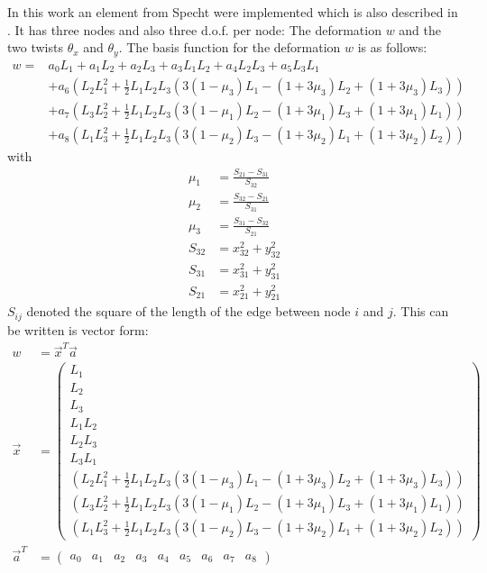   In this work an element from Specht \cite{specht1988modified} were implemented which is also described in \cite{steinke2005finite}. It has three nodes and also three d.o.f. per node: The deformation $w$ and the two twists $\theta_x$ and $\theta_y$. The basis function for the deformation $w$ is as follows:
  \begin{align}
  w = &a_0 L_1 + a_1 L_2 + a_2 L_3 + a_3 L_1L_2 + a_4 L_2L_3 + a_5 L_3L_1 \nonumber\\
    & + a_6\left(L_2L_1^2 + \frac{1}{2}L_1L_2L_3 \left(3(1-\mu_3)L_1 - (1+3\mu_3)L_2 + (1+3\mu_3)L_3\right)\right) \nonumber\\
    & + a_7\left(L_3L_2^2 + \frac{1}{2}L_1L_2L_3 \left(3(1-\mu_1)L_2 - (1+3\mu_1)L_3 + (1+3\mu_1)L_1\right)\right) \nonumber\\
    & + a_8\left(L_1L_3^2 + \frac{1}{2}L_1L_2L_3 \left(3(1-\mu_2)L_3 - (1+3\mu_2)L_1 + (1+3\mu_2)L_2\right)\right)
  \end{align}
  with
  \begin{align}
  \mu_1 &= \frac{S_{21} - S_{31}}{S_{32}} \nonumber\\
  \mu_2 &= \frac{S_{32} - S_{21}}{S_{31}} \nonumber\\
  \mu_3 &= \frac{S_{31} - S_{32}}{S_{21}} \\
  S_{32} &= x_{32}^2 + y_{32}^2 \nonumber\\
  S_{31} &= x_{31}^2 + y_{31}^2 \nonumber\\
  S_{21} &= x_{21}^2 + y_{21}^2
  \end{align}
  $S_{ij}$ denoted the square of the length of the edge between node $i$ and $j$.
  This can be written is vector form:
  \begin{align}\label{eq:platet3w=x*a}
  w &= \vec{x}^T \vec{a} \nonumber\\
  \vec{x} &= \begin{pmatrix}
  L_1 \\ L_2 \\ L_3 \\ L_1L_2 \\ L_2L_3 \\ L_3L_1\\
  \left(L_2L_1^2+\frac{1}{2}L_1L_2L_3\left(3(1-\mu_3)L_1-(1+3\mu_3)L_2+(1+3\mu_3)L_3\right)\right)\\
  \left(L_3L_2^2+\frac{1}{2}L_1L_2L_3\left(3(1-\mu_1)L_2-(1+3\mu_1)L_3+(1+3\mu_1)L_1\right)\right)\\
  \left(L_1L_3^2+\frac{1}{2}L_1L_2L_3\left(3(1-\mu_2)L_3-(1+3\mu_2)L_1+(1+3\mu_2)L_2\right)\right)
  \end{pmatrix} \nonumber\\
  \vec{a}^T &= \begin{pmatrix}
  a_0 & a_1 & a_2 & a_3 & a_4 & a_5 & a_6 & a_7 & a_8
  \end{pmatrix}
  \end{align}
  
